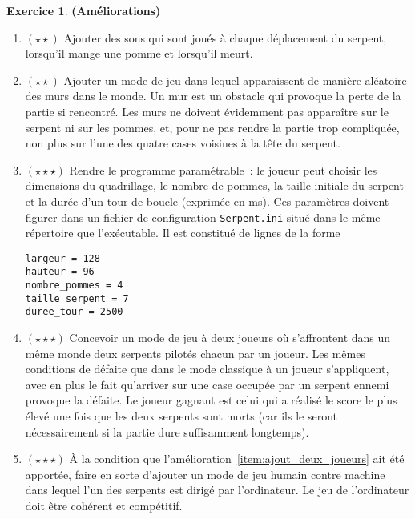 \documentclass[11pt]{article}
\theoremstyle{definition}
\newtheorem{Exercice}{Exercice}
\begin{document}
\begin{Exercice} {\bf (Améliorations)}
\begin{enumerate}
    \item $(\star\star)$
    Ajouter des sons qui sont joués à chaque déplacement du serpent,
    lorsqu'il mange une pomme et lorsqu'il meurt.
    \smallskip
    
    \item $(\star\star)$
    Ajouter un mode de jeu dans lequel apparaissent de manière 
    aléatoire des murs dans le monde. Un mur est un obstacle qui
    provoque la perte de la partie si rencontré. Les murs ne doivent
    évidemment pas apparaître sur le serpent ni sur les pommes, et,
    pour ne pas rendre la partie trop compliquée, non plus sur l'une
    des quatre cases voisines à la tête du serpent.
    \smallskip

    \item \label{item:ajout_parametres}
    $(\star\star\star)$
    Rendre le programme paramétrable~: le joueur peut choisir
    les dimensions du quadrillage, le nombre de pommes, la taille
    initiale du serpent et la durée d'un tour de boucle (exprimée
    en ms). Ces paramètres doivent figurer dans un fichier de configuration
    {\tt Serpent.ini} situé dans le même répertoire que l'exécutable.
    Il est constitué de lignes de la forme
\begin{small}
\begin{verbatim}
largeur = 128
hauteur = 96
nombre_pommes = 4
taille_serpent = 7
duree_tour = 2500
\end{verbatim}
\end{small}
    \smallskip

    \item \label{item:ajout_deux_joueurs}
    $(\star\star\star)$
    Concevoir un mode de jeu à deux joueurs où s'affrontent dans un 
    même monde deux serpents pilotés chacun par un joueur. Les mêmes
    conditions de défaite que dans le mode classique à un joueur 
    s'appliquent, avec en plus le fait qu'arriver sur une case
    occupée par un serpent ennemi provoque la défaite. Le joueur
    gagnant est celui qui a réalisé le score le plus élevé une fois
    que les deux serpents sont morts (car ils le seront nécessairement
    si la partie dure suffisamment longtemps).
    \smallskip
    
    \item $(\star\star\star)$
    À la condition que l'amélioration~\ref{item:ajout_deux_joueurs} ait
    été apportée, faire en sorte d'ajouter un mode de jeu humain contre 
    machine dans lequel l'un des serpents est dirigé par l'ordinateur.
    Le jeu de l'ordinateur doit être cohérent et compétitif.
\end{enumerate}
\end{Exercice}
\bigskip
\end{document}
